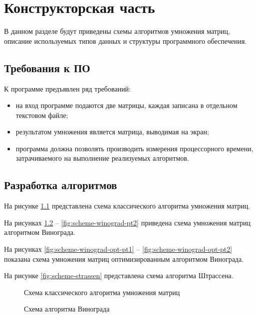 \chapter{Конструкторская часть}

В данном разделе будут приведены схемы алгоритмов умножения матриц, описание используемых типов данных и структуры программного обеспечения.

\section{Требования к ПО}

К программе предъявлен ряд требований:

\begin{itemize}
    \item на вход программе подаются две матрицы, каждая записана в отдельном текстовом файле;
    \item результатом умножения является матрица, выводимая на экран;
    \item программа должна позволять производить измерения процессорного времени, затрачиваемого на выполнение реализуемых алгоритмов.
\end{itemize}

\section{Разработка алгоритмов}

На рисунке \ref{fig:scheme-classic} представлена схема классического алгоритма умножения матриц.

На рисунках \ref{fig:scheme-winograd-pt1} -- \ref{fig:scheme-winograd-pt2} приведена схема умножения матриц алгоритмом Винограда.

На рисунках \ref{fig:scheme-winograd-opt-pt1} -- \ref{fig:scheme-winograd-opt-pt2} показана схема умножения матриц оптимизированным алгоритмом Винограда.

На рисунке \ref{fig:scheme-strassen} представлена схема алгоритма Штрассена.

\begin{figure}[H]
    \centering
    
    \caption{Схема классического алгоритма умножения матриц}
    \label{fig:scheme-classic}
\end{figure}

\begin{figure}[H]
    \centering
    
    \caption{Схема алгоритма Винограда}
    \label{fig:scheme-winograd-pt1}
\end{figure}

